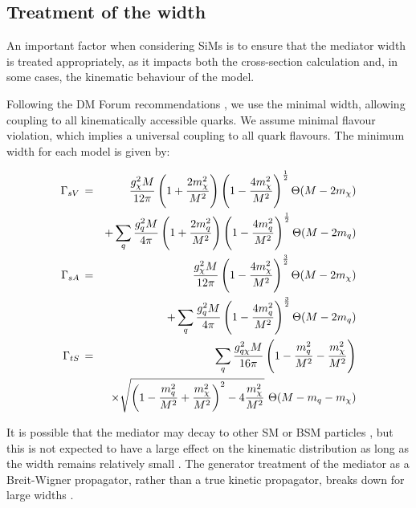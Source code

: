 \subsection{Treatment of the width}
\label{width_effects}
An important factor when considering SiMs is to ensure that the mediator width is treated appropriately, as it impacts both the cross-section calculation and, in some cases, the kinematic behaviour of the model.

Following the DM Forum recommendations \cite{DMForumReport}, we use the minimal width, allowing coupling to all kinematically accessible quarks. We assume minimal flavour violation, which implies a universal coupling to all quark flavours. The minimum  width for each model is given by:

\begin{eqnarray}
    \Gamma_{sV} \, &=& \,  \frac{g_{\chi}^2 M}{12\pi}\left(1 + \frac{2 m_{\chi}^{2}}{M^{2}}\right)\left(1 - \frac{4 m_{\chi}^{2}}{M^{2}}\right)^{\frac{1}{2}} \Theta(M-2 m_{\chi}) \nonumber\\
                  && + \sum_{\substack{q}}\frac{g_q^2M}{4\pi}\left(1 + \frac{2m_{q}^{2}}{M^{2}}\right)\left(1 - \frac{4m_{q}^{2}}{M^{2}}\right)^{\frac{1}{2}} \Theta(M-2m_q)\\
    \Gamma_{sA} \, &=& \,  \frac{g_{\chi}^2 M}{12\pi}\left(1 - \frac{4 m_{\chi}^{2}}{M^{2}}\right)^{\frac{3}{2}} \Theta(M-2 m_{\chi}) \nonumber\\
                  && + \sum_{\substack{q}}\frac{g_q^2 M}{4\pi}\left(1 - \frac{4m_{q}^{2}}{M^{2}}\right)^{\frac{3}{2}} \Theta(M-2m_q) \\
    \Gamma_{tS} \, &=& \,  \sum_{\substack{q}} \frac{g_{q \chi}^2M}{16\pi}\left(1 - \frac{m_{q}^{2}}{M^{2}} - \frac{m_{\chi}^{2}}{M^{2}}\right) \nonumber\\
                  && \times \sqrt{\left(1 - \frac{m_{q}^{2}}{M^{2}} + \frac{m_{\chi}^{2}}{M^{2}}\right)^{2} - 4\frac{m_{\chi}^{2}}{M^{2}}} \,\, \Theta(M-m_q- m_{\chi}) 
\end{eqnarray}


It is possible that the mediator may decay to other SM or BSM particles \cite{Harris:2014hga}, but this is not expected to have a large effect on the kinematic distribution as long as the width remains relatively small \cite{DMForumReport}.
The generator treatment of the mediator as a Breit-Wigner propagator, rather than a true kinetic propagator, breaks down for large widths \cite{An:2012va,NordstromSVD}.

